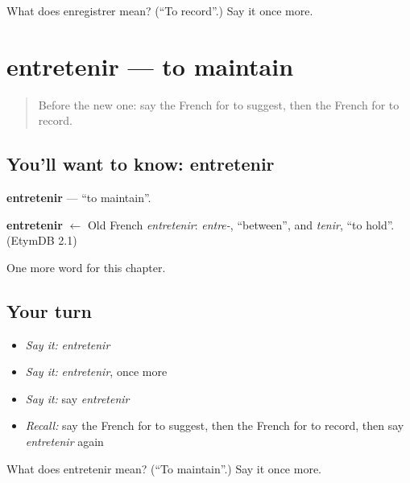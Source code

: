 \begin{tcolorbox}[breakable,colback=teal!4,colframe=teal!35!black,title={Before you move on}]
What does enregistrer mean? (\textquotedblleft{}To record\textquotedblright{}.) Say it once more.
\end{tcolorbox}
\section[entretenir]{entretenir — to maintain}

\label{lesson:FR-C214-entretenir}



\begin{quote}
Before the new one: say the French for to suggest, then the French for to record.
\end{quote}

\subsection*{You'll want to know: entretenir}
\textbf{entretenir} — \textquotedblleft{}to maintain\textquotedblright{}.

\begin{cousinweb}
\textbf{entretenir} $\leftarrow$ Old French \emph{entretenir}: \emph{entre-}, \textquotedblleft{}between\textquotedblright{}, and \emph{tenir}, \textquotedblleft{}to hold\textquotedblright{}. (EtymDB 2.1)
\end{cousinweb}

\begin{grammarlens}[title={What you've built}]
One more word for this chapter.
\end{grammarlens}

\subsection*{Your turn}
\begin{itemize}
\raggedright
  \item \emph{Say it:} \emph{entretenir}
  \item \emph{Say it:} \emph{entretenir}, once more
  \item \emph{Say it:} say \emph{entretenir}
  \item \emph{Recall:} say the French for to suggest, then the French for to record, then say \emph{entretenir} again
\end{itemize}

\begin{tcolorbox}[breakable,colback=teal!4,colframe=teal!35!black,title={Before you move on}]
What does entretenir mean? (\textquotedblleft{}To maintain\textquotedblright{}.) Say it once more.
\end{tcolorbox}
